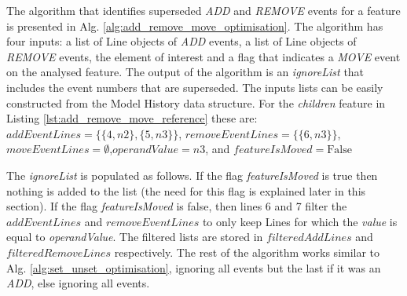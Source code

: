 \documentclass{llncs}
\begin{document}

The algorithm that identifies superseded \emph{ADD} and \emph{REMOVE} events for a feature is presented in Alg. \ref{alg:add_remove_move_optimisation}.
The algorithm has four inputs: a list of Line objects of \emph{ADD} events, a list of Line objects of \emph{REMOVE} events, the element of interest and a flag that indicates a \emph{MOVE} event on the analysed feature. 
The output of the algorithm is an \emph{ignoreList} that includes the event numbers that are superseded.
The inputs lists can be easily constructed from the Model History data structure.
For the \emph{children} feature in Listing \ref{lst:add_remove_move_reference} these are: $addEventLines = \{  \{4, n2 \}, \{5, n3 \} \}$, $removeEventLines = \{\{6, n3 \}\}$, $moveEventLines = \emptyset$,\linebreak $operandValue = n3$, and $featureIsMoved = \mathrm{False}$

The \emph{ignoreList} is populated as follows.
If the flag \emph{featureIsMoved} is true then nothing is added to the list (the need for this flag is explained later in this section).
If the flag \emph{featureIsMoved} is false, then lines 6 and 7 filter the $addEventLines$ and $removeEventLines$ to only keep Lines for which the \emph{value} is equal to \emph{operandValue}.
The filtered lists are stored in $filteredAddLines$ and $filteredRemoveLines$ respectively.
The rest of the algorithm works similar to Alg. \ref{alg:set_unset_optimisation}, ignoring all events but the last if it was an \emph{ADD}, else ignoring all events. 

\end{document}
